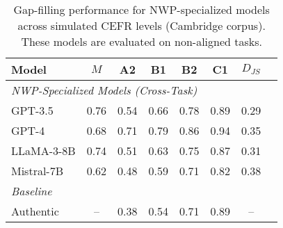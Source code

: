 \begin{table}[ht]
\centering
\caption{Gap-filling performance for NWP-specialized models across simulated CEFR levels (Cambridge corpus). These models are evaluated on non-aligned tasks.}
\label{tab:gap_filling_nwp}
\small
\begin{tabular}{lccccccc}
\toprule
\textbf{Model} & \textbf{$M$} & \textbf{A2} & \textbf{B1} & \textbf{B2} & \textbf{C1} & \textbf{$D_{JS}$} \\
\midrule
\multicolumn{7}{l}{\textit{NWP-Specialized Models (Cross-Task)}} \\
GPT-3.5 & 0.76 & 0.54 & 0.66 & 0.78 & 0.89 & 0.29 \\
GPT-4 & 0.68 & 0.71 & 0.79 & 0.86 & 0.94 & 0.35 \\
LLaMA-3-8B & 0.74 & 0.51 & 0.63 & 0.75 & 0.87 & 0.31 \\
Mistral-7B & 0.62 & 0.48 & 0.59 & 0.71 & 0.82 & 0.38 \\
\midrule
\multicolumn{7}{l}{\textit{Baseline}} \\
Authentic & -- & 0.38 & 0.54 & 0.71 & 0.89 & -- \\
\bottomrule
\end{tabular}
\end{table}
